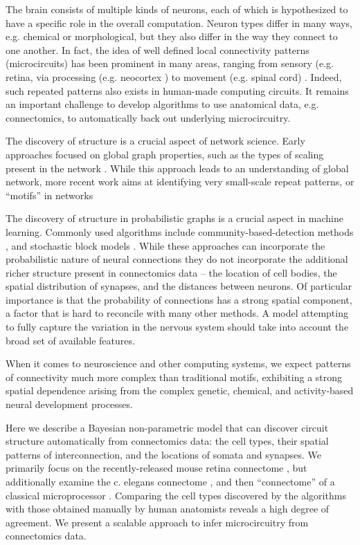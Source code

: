 \documentclass{nature}
\begin{document}
The brain consists of multiple kinds of neurons, each of which is
hypothesized to have a specific role in the overall
computation. Neuron types differ in many ways, e.g. chemical or
morphological, but they also differ in the way they connect to one
another. In fact, the idea of well defined local connectivity patterns
(microcircuits) has been prominent in many areas, ranging from sensory
(e.g. retina, \autocite{Masland2001} via processing (e.g. neocortex
\autocite{Mountcastle1997}) to movement (e.g. spinal cord)
\autocite{Grillner2005}. Indeed, such repeated patterns also exists in
human-made computing circuits. It remains an important challenge to
develop algorithms to use anatomical data, e.g. connectomics, to automatically back
out underlying microcircuitry.

The discovery of structure is a crucial aspect of network
science. Early approaches focused on global graph properties, such as
the types of scaling present in the network \autocite
{WattsStrogatz1998} .  While this approach leads to an understanding
of global network, more recent work aims at identifying very small-scale
repeat patterns, or “motifs” in networks\autocite{Milo2002}

The discovery of structure in probabilistic graphs is a crucial aspect
in machine learning. Commonly used algorithms include
community-based-detection methods \autocite{Girvan2002}, and
stochastic block models \autocite{Nowicki2001}.  While these
approaches can incorporate the probabilistic nature of neural
connections \autocite{Hill2012} they do not incorporate the additional
richer structure present in connectomics data -- the location of cell
bodies, the spatial distribution of synapses, and the distances
between neurons. Of particular importance is that the probability of
connections has a strong spatial component, a factor that is hard to
reconcile with many other methods. A model attempting to fully capture
the variation in the nervous system should take into account the broad
set of available features.

When it comes to neuroscience and other computing systems, we expect
patterns of connectivity much more complex than traditional motifs,
exhibiting a strong spatial dependence arising from the complex
genetic, chemical, and activity-based neural development processes.


Here we describe a Bayesian non-parametric model that can discover
circuit structure automatically from connectomics data: the cell
types, their spatial patterns of interconnection, and the locations of
somata and synapses. We primarily focus on the recently-released mouse
retina connectome \autocite{Helmstaedter2013}, but additionally
examine the c. elegans connectome \autocite{White1986}, and then
``connectome'' of a classical microprocessor
\autocite{James2010}. Comparing the cell types discovered by the
algorithms with those obtained manually by human anatomists reveals a
high degree of agreement. We present a scalable approach to infer
microcircuitry from connectomics data.
\end{document}
